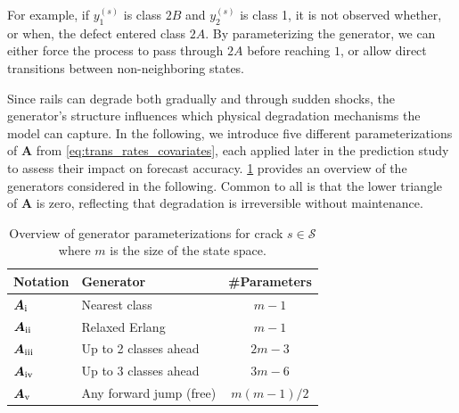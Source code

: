 \documentclass{article}
\newcommand{\RN}[1]{\textup{\uppercase\expandafter{\romannumeral#1}}}
\begin{document}
For example, if $y_1^{(s)}$ is class $2B$ and $y_2^{(s)}$ is class 1, it is not observed whether, or when, the defect entered class $2A$. By parameterizing the generator, we can either force the process to pass through $2A$ before reaching $1$, or allow direct transitions between non-neighboring states. 

Since rails can degrade both gradually and through sudden shocks, the generator’s structure influences which physical degradation mechanisms the model can capture. In the following, we introduce five different parameterizations of $\bm{A}$ from \cref{eq:trans_rates_covariates}, each applied later in the prediction study to assess their impact on forecast accuracy. \cref{tab:generators_overview} provides an overview of the generators considered in the following. Common to all is that the lower triangle of $\bm{A}$ is zero, reflecting that degradation is irreversible without maintenance.

\begin{table}[htb!]
\centering
\caption{Overview of generator parameterizations for crack $s \in \mathcal{S}$ where $m$ is the size of the state space.}
\label{tab:generators_overview}
\begin{tabular}{@{}llc@{}}
\toprule
Notation & Generator & \#Parameters \\\midrule
$\bm{A}_{\RN{1}}$ & Nearest class & $m - 1$ \\$\bm{A}_{\RN{2}}$ & Relaxed Erlang & $m - 1$ \\$\bm{A}_{\RN{3}}$ & Up to 2 classes ahead & $2m - 3$ \\$\bm{A}_{\RN{4}}$ & Up to 3 classes ahead & $3m - 6$ \\$\bm{A}_{\RN{5}}$ & Any forward jump (free) & $m(m-1)/2$ \\\bottomrule
\end{tabular}
\end{table}
\end{document}
